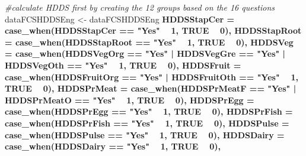 \documentclass[
]{book}
\newenvironment{Shaded}{\begin{snugshade}}{\end{snugshade}}
\newcommand{\CommentTok}[1]{\textcolor[rgb]{0.56,0.35,0.01}{\textit{#1}}}
\newcommand{\DataTypeTok}[1]{\textcolor[rgb]{0.13,0.29,0.53}{#1}}
\newcommand{\DecValTok}[1]{\textcolor[rgb]{0.00,0.00,0.81}{#1}}
\newcommand{\KeywordTok}[1]{\textcolor[rgb]{0.13,0.29,0.53}{\textbf{#1}}}
\newcommand{\NormalTok}[1]{#1}
\newcommand{\OperatorTok}[1]{\textcolor[rgb]{0.81,0.36,0.00}{\textbf{#1}}}
\newcommand{\OtherTok}[1]{\textcolor[rgb]{0.56,0.35,0.01}{#1}}
\newcommand{\StringTok}[1]{\textcolor[rgb]{0.31,0.60,0.02}{#1}}
\begin{document}
\begin{Shaded}
\begin{Highlighting}[]
{{\CommentTok{#calculate HDDS first by creating the 12 groups based on the 16 questions }
\NormalTok{dataFCSHDDSEng <-}\StringTok{ }\NormalTok{dataFCSHDDSEng }\OperatorTok{%>%}\StringTok{ }\KeywordTok{mutate}\NormalTok{(}
    \DataTypeTok{HDDSStapCer =} \KeywordTok{case_when}\NormalTok{(HDDSStapCer }\OperatorTok{==}\StringTok{ "Yes"} \OperatorTok{~}\StringTok{ }\DecValTok{1}\NormalTok{, }\OtherTok{TRUE} \OperatorTok{~}\StringTok{ }\DecValTok{0}\NormalTok{),}
    \DataTypeTok{HDDSStapRoot =} \KeywordTok{case_when}\NormalTok{(HDDSStapRoot  }\OperatorTok{==}\StringTok{ "Yes"} \OperatorTok{~}\StringTok{ }\DecValTok{1}\NormalTok{, }\OtherTok{TRUE} \OperatorTok{~}\StringTok{ }\DecValTok{0}\NormalTok{),}
    \DataTypeTok{HDDSVeg =} \KeywordTok{case_when}\NormalTok{(HDDSVegOrg  }\OperatorTok{==}\StringTok{ "Yes"} \OperatorTok{|}\StringTok{ }\NormalTok{HDDSVegGre }\OperatorTok{==}\StringTok{ "Yes"} \OperatorTok{|}\StringTok{ }\NormalTok{HDDSVegOth }\OperatorTok{==}\StringTok{ "Yes"} \OperatorTok{~}\StringTok{ }\DecValTok{1}\NormalTok{, }\OtherTok{TRUE} \OperatorTok{~}\StringTok{ }\DecValTok{0}\NormalTok{),}
    \DataTypeTok{HDDSFruit =} \KeywordTok{case_when}\NormalTok{(HDDSFruitOrg }\OperatorTok{==}\StringTok{ "Yes"} \OperatorTok{|}\StringTok{ }\NormalTok{HDDSFruitOth }\OperatorTok{==}\StringTok{ "Yes"} \OperatorTok{~}\StringTok{ }\DecValTok{1}\NormalTok{, }\OtherTok{TRUE} \OperatorTok{~}\StringTok{ }\DecValTok{0}\NormalTok{),}
    \DataTypeTok{HDDSPrMeat =} \KeywordTok{case_when}\NormalTok{(HDDSPrMeatF }\OperatorTok{==}\StringTok{ "Yes"} \OperatorTok{|}\StringTok{ }\NormalTok{HDDSPrMeatO }\OperatorTok{==}\StringTok{ "Yes"} \OperatorTok{~}\StringTok{ }\DecValTok{1}\NormalTok{, }\OtherTok{TRUE} \OperatorTok{~}\StringTok{ }\DecValTok{0}\NormalTok{),}
    \DataTypeTok{HDDSPrEgg =} \KeywordTok{case_when}\NormalTok{(HDDSPrEgg  }\OperatorTok{==}\StringTok{ "Yes"} \OperatorTok{~}\StringTok{ }\DecValTok{1}\NormalTok{, }\OtherTok{TRUE} \OperatorTok{~}\StringTok{ }\DecValTok{0}\NormalTok{),}
    \DataTypeTok{HDDSPrFish =} \KeywordTok{case_when}\NormalTok{(HDDSPrFish }\OperatorTok{==}\StringTok{ "Yes"} \OperatorTok{~}\StringTok{ }\DecValTok{1}\NormalTok{, }\OtherTok{TRUE} \OperatorTok{~}\StringTok{ }\DecValTok{0}\NormalTok{),}
    \DataTypeTok{HDDSPulse =} \KeywordTok{case_when}\NormalTok{(HDDSPulse }\OperatorTok{==}\StringTok{ "Yes"} \OperatorTok{~}\StringTok{ }\DecValTok{1}\NormalTok{, }\OtherTok{TRUE} \OperatorTok{~}\StringTok{ }\DecValTok{0}\NormalTok{),}
    \DataTypeTok{HDDSDairy =} \KeywordTok{case_when}\NormalTok{(HDDSDairy }\OperatorTok{==}\StringTok{ "Yes"} \OperatorTok{~}\StringTok{ }\DecValTok{1}\NormalTok{, }\OtherTok{TRUE} \OperatorTok{~}\StringTok{ }\DecValTok{0}\NormalTok{),}
}}}
\end{Highlighting}
\end{Shaded}
\end{document}
